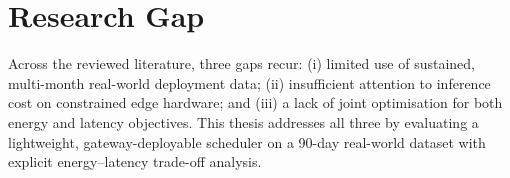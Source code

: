 \section{Research Gap}

Across the reviewed literature, three gaps recur: (i) limited use of sustained, multi-month
real-world deployment data; (ii) insufficient attention to inference cost on constrained edge
hardware; and (iii) a lack of joint optimisation for both energy and latency objectives. This
thesis addresses all three by evaluating a lightweight, gateway-deployable scheduler on a 90-day
real-world dataset with explicit energy--latency trade-off analysis.
